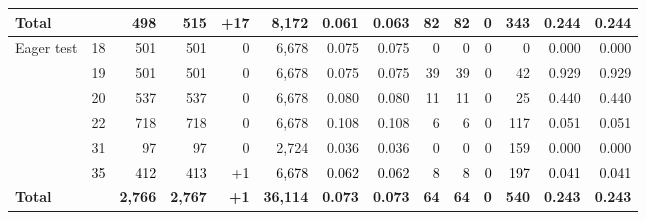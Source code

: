 \begin{xltabular}{\linewidth}{l r r r r r r r r r r r r r}
    \textbf{Total} & & \textbf{498} & \textbf{515} & \textbf{+17} & \textbf{8,172} & \textbf{0.061} & \textbf{0.063} & \textbf{82} & \textbf{82} & \textbf{0} & \textbf{343} & \textbf{0.244} & \textbf{0.244} \\
  \midrule
    \textcolor{muted}{Eager test} & \textcolor{muted}{18} & \textcolor{muted}{501} & \textcolor{muted}{501} & \textcolor{muted}{0} & \textcolor{muted}{6,678} & \textcolor{muted}{0.075} & \textcolor{muted}{0.075} & \textcolor{muted}{0} & \textcolor{muted}{0} & \textcolor{muted}{0} & \textcolor{muted}{0} & \textcolor{muted}{0.000} & \textcolor{muted}{0.000} \\
     & \textcolor{muted}{19} & \textcolor{muted}{501} & \textcolor{muted}{501} & \textcolor{muted}{0} & \textcolor{muted}{6,678} & \textcolor{muted}{0.075} & \textcolor{muted}{0.075} & \textcolor{muted}{39} & \textcolor{muted}{39} & \textcolor{muted}{0} & \textcolor{muted}{42} & \textcolor{muted}{0.929} & \textcolor{muted}{0.929} \\
     & \textcolor{muted}{20} & \textcolor{muted}{537} & \textcolor{muted}{537} & \textcolor{muted}{0} & \textcolor{muted}{6,678} & \textcolor{muted}{0.080} & \textcolor{muted}{0.080} & \textcolor{muted}{11} & \textcolor{muted}{11} & \textcolor{muted}{0} & \textcolor{muted}{25} & \textcolor{muted}{0.440} & \textcolor{muted}{0.440} \\
     & \textcolor{muted}{22} & \textcolor{muted}{718} & \textcolor{muted}{718} & \textcolor{muted}{0} & \textcolor{muted}{6,678} & \textcolor{muted}{0.108} & \textcolor{muted}{0.108} & \textcolor{muted}{6} & \textcolor{muted}{6} & \textcolor{muted}{0} & \textcolor{muted}{117} & \textcolor{muted}{0.051} & \textcolor{muted}{0.051} \\
     & \textcolor{muted}{31} & \textcolor{muted}{97} & \textcolor{muted}{97} & \textcolor{muted}{0} & \textcolor{muted}{2,724} & \textcolor{muted}{0.036} & \textcolor{muted}{0.036} & \textcolor{muted}{0} & \textcolor{muted}{0} & \textcolor{muted}{0} & \textcolor{muted}{159} & \textcolor{muted}{0.000} & \textcolor{muted}{0.000} \\
     & \textcolor{black}{35} & \textcolor{black}{412} & \textcolor{black}{413} & \textcolor{black}{+1} & \textcolor{black}{6,678} & \textcolor{black}{0.062} & \textcolor{black}{0.062} & \textcolor{black}{8} & \textcolor{black}{8} & \textcolor{black}{0} & \textcolor{black}{197} & \textcolor{black}{0.041} & \textcolor{black}{0.041} \\
    \textbf{Total} & & \textbf{2,766} & \textbf{2,767} & \textbf{+1} & \textbf{36,114} & \textbf{0.073} & \textbf{0.073} & \textbf{64} & \textbf{64} & \textbf{0} & \textbf{540} & \textbf{0.243} & \textbf{0.243} \\

\end{xltabular}
